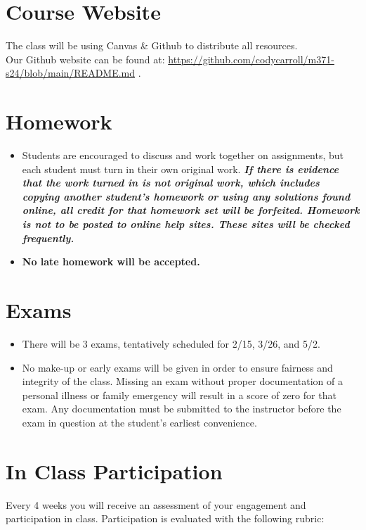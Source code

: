 \documentclass[10pt, oneside]{article}
\begin{document}
\section*{Course Website}
The class will be using Canvas \& Github to distribute all resources. \\Our Github website can be found at: \url{https://github.com/codycarroll/m371-s24/blob/main/README.md} .


\section*{Homework}
\begin{itemize}
	\item Students are encouraged to discuss and work together on assignments, but each student must turn in their own original work. \textit{ \textbf{If there is evidence that the work turned in is not original work, which includes copying another student's homework or using any solutions found online, all credit for that homework set will be forfeited.  Homework is not to be posted to online help sites.  These sites will be checked frequently. }} 
	\item \textbf{No late homework will be accepted.}
\end{itemize}
\section*{Exams}  
\begin{itemize}
	\item There will be 3 exams, tentatively scheduled for 2/15, 3/26, and 5/2.
	\item No make-up or early exams will be given in order to ensure fairness and integrity of the class.  Missing an exam without proper documentation of a personal illness or family emergency will result in a score of zero for that exam. Any documentation must be submitted to the instructor before the exam in question at the student's earliest convenience. 
\end{itemize}

\section*{In Class Participation}  
Every 4 weeks you will receive an assessment of your engagement and participation in class. Participation is evaluated with the following rubric: \\
\end{document}
